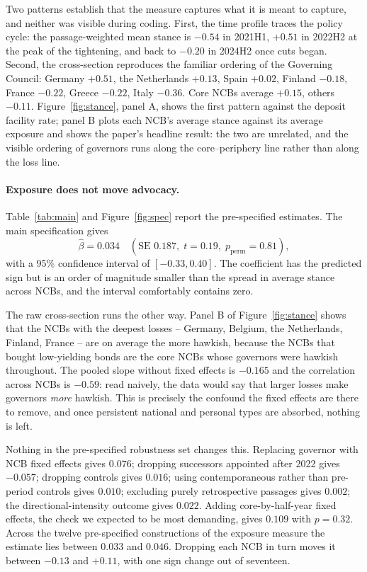 \documentclass[11pt]{article}
\theoremstyle{plain}
\begin{document}
Two patterns establish that the measure captures what it is meant to capture, and neither was visible during coding. First, the time profile traces the policy cycle: the passage-weighted mean stance is $-0.54$ in 2021H1, $+0.51$ in 2022H2 at the peak of the tightening, and back to $-0.20$ in 2024H2 once cuts began. Second, the cross-section reproduces the familiar ordering of the Governing Council: Germany $+0.51$, the Netherlands $+0.13$, Spain $+0.02$, Finland $-0.18$, France $-0.22$, Greece $-0.22$, Italy $-0.36$. Core NCBs average $+0.15$, others $-0.11$. Figure~\ref{fig:stance}, panel A, shows the first pattern against the deposit facility rate; panel B plots each NCB's average stance against its average exposure and shows the paper's headline result: the two are unrelated, and the visible ordering of governors runs along the core--periphery line rather than along the loss line.

\paragraph{Exposure does not move advocacy.}
Table~\ref{tab:main} and Figure~\ref{fig:spec} report the pre-specified estimates. The main specification gives
\[
\hat\beta = 0.034 \quad (\text{SE } 0.187,\; t = 0.19,\; p_{\text{perm}} = 0.81),
\]
with a 95\% confidence interval of $[-0.33, 0.40]$. The coefficient has the predicted sign but is an order of magnitude smaller than the spread in average stance across NCBs, and the interval comfortably contains zero.

The raw cross-section runs the other way. Panel B of Figure~\ref{fig:stance} shows that the NCBs with the deepest losses -- Germany, Belgium, the Netherlands, Finland, France -- are on average the more hawkish, because the NCBs that bought low-yielding bonds are the core NCBs whose governors were hawkish throughout. The pooled slope without fixed effects is $-0.165$ and the correlation across NCBs is $-0.59$: read naively, the data would say that larger losses make governors \emph{more} hawkish. This is precisely the confound the fixed effects are there to remove, and once persistent national and personal types are absorbed, nothing is left.

Nothing in the pre-specified robustness set changes this. Replacing governor with NCB fixed effects gives $0.076$; dropping successors appointed after 2022 gives $-0.057$; dropping controls gives $0.016$; using contemporaneous rather than pre-period controls gives $0.010$; excluding purely retrospective passages gives $0.002$; the directional-intensity outcome gives $0.022$. Adding core-by-half-year fixed effects, the check we expected to be most demanding, gives $0.109$ with $p=0.32$. Across the twelve pre-specified constructions of the exposure measure the estimate lies between $0.033$ and $0.046$. Dropping each NCB in turn moves it between $-0.13$ and $+0.11$, with one sign change out of seventeen.
\end{document}
